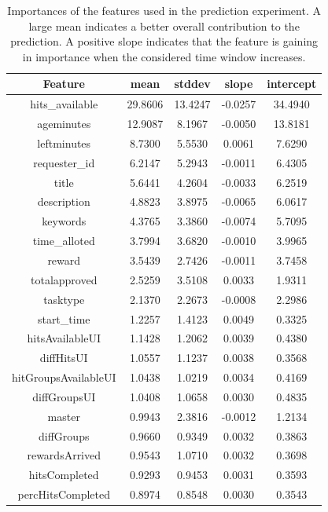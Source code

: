 \begin{table}[t!]
\scriptsize
\caption {Importances of the features used in the prediction experiment. A large mean indicates a better overall contribution to the prediction. A positive slope indicates that the feature is gaining in importance when the considered time window increases.}
\begin{tabular}{|c|c|c|c|c|}
\hline
Feature              & mean      & stddev    & slope     & intercept \\
\hline
hits\_available      & 29.8606 & 13.4247 & -0.0257 & 34.4940 \\
ageminutes           & 12.9087 &  8.1967 & -0.0050 & 13.8181 \\
leftminutes          &  8.7300 &  5.5530 & 0.0061 & 7.6290 \\
requester\_id        &  6.2147 &  5.2943 & -0.0011 & 6.4305 \\
title                &  5.6441 &  4.2604 & -0.0033 & 6.2519 \\
description          &  4.8823 &  3.8975 & -0.0065 & 6.0617 \\
keywords             &  4.3765 &  3.3860 & -0.0074 & 5.7095 \\
time\_alloted        &  3.7994 &  3.6820 & -0.0010 & 3.9965 \\
reward               &  3.5439 &  2.7426 & -0.0011 & 3.7458 \\
totalapproved        &  2.5259 &  3.5108 & 0.0033 & 1.9311 \\
tasktype             &  2.1370 &  2.2673 & -0.0008 & 2.2986 \\
start\_time          &  1.2257 &  1.4123 & 0.0049 & 0.3325 \\
hitsAvailableUI      &  1.1428 &  1.2062 & 0.0039 & 0.4380 \\
diffHitsUI           &  1.0557 &  1.1237 & 0.0038 & 0.3568 \\
hitGroupsAvailableUI &  1.0438 &  1.0219 & 0.0034 & 0.4169 \\
diffGroupsUI         &  1.0408 &  1.0658 & 0.0030 & 0.4835 \\
master               &  0.9943 &  2.3816 & -0.0012 & 1.2134 \\
diffGroups           &  0.9660 &  0.9349 & 0.0032 & 0.3863 \\
rewardsArrived       &  0.9543 &  1.0710 & 0.0032 & 0.3698 \\
hitsCompleted        &  0.9293 &  0.9453 & 0.0031 & 0.3593 \\
percHitsCompleted    &  0.8974 &  0.8548 & 0.0030 & 0.3543 \\

\end{tabular}
\end{table}
